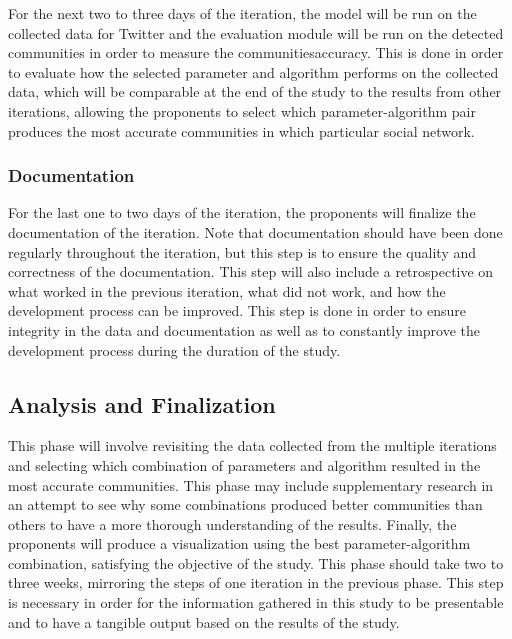 For the next two to three days of the iteration, the model will be run on the collected data for Twitter and the evaluation module will be run on the detected communities in order to measure the communities\vtick accuracy. This is done in order to evaluate how the selected parameter and algorithm performs on the collected data, which will be comparable at the end of the study to the results from other iterations, allowing the proponents to select which parameter-algorithm pair produces the most accurate communities in which particular social network.


\subsubsection{Documentation}


For the last one to two days of the iteration, the proponents will finalize the documentation of the iteration. Note that documentation should have been done regularly throughout the iteration, but this step is to ensure the quality and correctness of the documentation. This step will also include a retrospective on what worked in the previous iteration, what did not work, and how the development process can be improved. This step is done in order to ensure integrity in the data and documentation as well as to constantly improve the development process during the duration of the study.


\subsection{Analysis and Finalization}


This phase will involve revisiting the data collected from the multiple iterations and selecting which combination of parameters and algorithm resulted in the most accurate communities. This phase may include supplementary research in an attempt to see why some combinations produced better communities than others to have a more thorough understanding of the results. Finally, the proponents will produce a visualization using the best parameter-algorithm combination, satisfying the objective of the study. This phase should take two to three weeks, mirroring the steps of one iteration in the previous phase. This step is necessary in order for the information gathered in this study to be presentable and to have a tangible output based on the results of the study.


